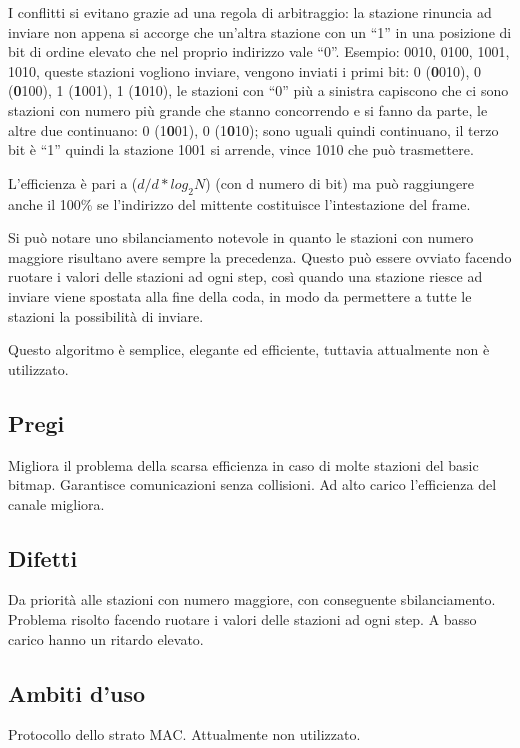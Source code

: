 I conflitti si evitano grazie ad una regola di arbitraggio: la stazione rinuncia ad inviare non appena si accorge che un’altra stazione con un “1” in una posizione di bit di ordine elevato che nel proprio indirizzo vale “0”.
Esempio: 0010, 0100, 1001, 1010, queste stazioni vogliono inviare, vengono inviati i primi bit: 0 (\textbf{0}010), 0 (\textbf{0}100), 1 (\textbf{1}001), 1 (\textbf{1}010), le stazioni con “0” più a sinistra capiscono che ci sono stazioni con numero più grande che stanno concorrendo e si fanno da parte, le altre due continuano: 0 (1\textbf{0}01), 0 (1\textbf{0}10); sono uguali quindi continuano, il terzo bit è “1” quindi la stazione 1001 si arrende, vince 1010 che può trasmettere.

L’efficienza è pari a ($d/d*log_2N$) (con d numero di bit) ma può raggiungere anche il 100\% se l’indirizzo del mittente costituisce l’intestazione del frame.

Si può notare uno sbilanciamento notevole in quanto le stazioni con numero maggiore risultano avere sempre la precedenza. Questo può essere ovviato facendo ruotare i valori delle stazioni ad ogni step, così quando una stazione riesce ad inviare viene spostata alla fine della coda, in modo da permettere a tutte le stazioni la possibilità di inviare.

Questo algoritmo è semplice, elegante ed efficiente, tuttavia attualmente non è utilizzato.

\subsection{Pregi}
Migliora il problema della scarsa efficienza in caso di molte stazioni del basic bitmap.
Garantisce comunicazioni senza collisioni.
Ad alto carico l'efficienza del canale migliora.

\subsection{Difetti}
Da priorità alle stazioni con numero maggiore, con conseguente sbilanciamento. Problema risolto facendo ruotare i valori delle stazioni ad ogni step. 
A basso carico hanno un ritardo elevato.
\subsection{Ambiti d'uso}
Protocollo dello strato MAC. Attualmente non utilizzato.

